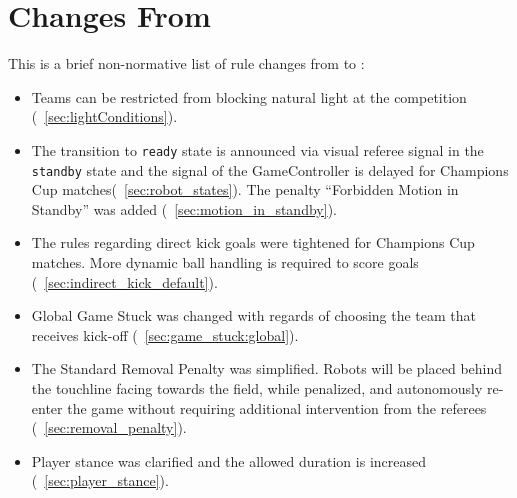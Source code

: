 \section{Changes From \LastRCYear}

This is a brief non-normative list of rule changes from \LastRCYear to \RCYear:
\begin{itemize}
  \item Teams can be restricted from blocking natural light at the competition (\cf~\cref{sec:lightConditions}).
  \item The transition to \texttt{ready} state is announced via visual referee signal in the \texttt{standby} state and the signal of the GameController is delayed for Champions Cup matches(\cf~\cref{sec:robot_states}). The penalty ``Forbidden Motion in Standby'' was added (\cf~\cref{sec:motion_in_standby}).
  \item The rules regarding direct kick goals were tightened for Champions Cup matches. More dynamic ball handling is required to score goals (\cf~\cref{sec:indirect_kick_default}).
  \item Global Game Stuck was changed with regards of choosing the team that receives kick-off (\cf~\cref{sec:game_stuck:global}).
  \item The Standard Removal Penalty was simplified. Robots will be placed behind the touchline facing towards the field, while penalized, and autonomously re-enter the game without requiring additional intervention from the referees (\cf~\cref{sec:removal_penalty}).
  \item Player stance was clarified and the allowed duration is increased (\cf~\cref{sec:player_stance}).
\end{itemize}
